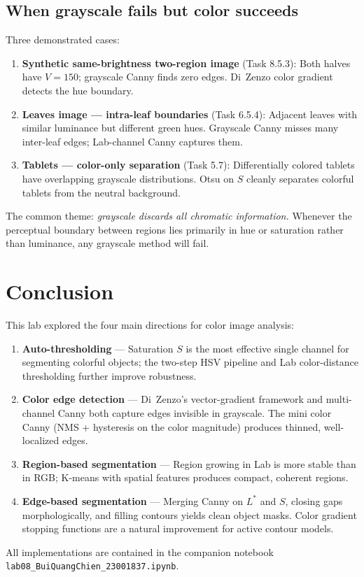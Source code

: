 \documentclass[12pt,a4paper]{article}
\begin{document}
\subsection{When grayscale fails but color succeeds}

Three demonstrated cases:

\begin{enumerate}
    \item \textbf{Synthetic same-brightness two-region image} (Task 8.5.3): Both halves have $V=150$; grayscale Canny finds zero edges. Di~Zenzo color gradient detects the hue boundary.

    \item \textbf{Leaves image — intra-leaf boundaries} (Task 6.5.4): Adjacent leaves with similar luminance but different green hues. Grayscale Canny misses many inter-leaf edges; Lab-channel Canny captures them.

    \item \textbf{Tablets — color-only separation} (Task 5.7): Differentially colored tablets have overlapping grayscale distributions. Otsu on $S$ cleanly separates colorful tablets from the neutral background.
\end{enumerate}

The common theme: \emph{grayscale discards all chromatic information.}  Whenever the perceptual boundary between regions lies primarily in hue or saturation rather than luminance, any grayscale method will fail.

\section{Conclusion}

This lab explored the four main directions for color image analysis:

\begin{enumerate}
    \item \textbf{Auto-thresholding} --- Saturation $S$ is the most effective single channel for segmenting colorful objects; the two-step HSV pipeline and Lab color-distance thresholding further improve robustness.
    \item \textbf{Color edge detection} --- Di~Zenzo's vector-gradient framework and multi-channel Canny both capture edges invisible in grayscale.  The mini color Canny (NMS + hysteresis on the color magnitude) produces thinned, well-localized edges.
    \item \textbf{Region-based segmentation} --- Region growing in Lab is more stable than in RGB; K-means with spatial features produces compact, coherent regions.
    \item \textbf{Edge-based segmentation} --- Merging Canny on $L^*$ and $S$, closing gaps morphologically, and filling contours yields clean object masks.  Color gradient stopping functions are a natural improvement for active contour models.
\end{enumerate}

All implementations are contained in the companion notebook \texttt{lab08\_BuiQuangChien\_23001837.ipynb}.
\end{document}
